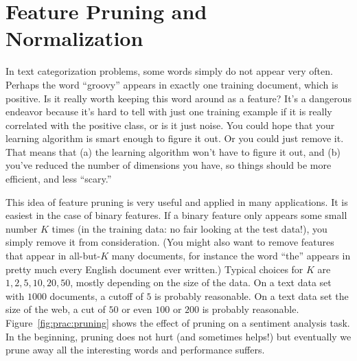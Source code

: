 

\section{Feature Pruning and Normalization}

In text categorization problems, some words simply do not appear very
often.  Perhaps the word ``groovy''
appears in exactly one training document, which is positive.  Is it
really worth keeping this word around as a feature?  It's a dangerous
endeavor because it's hard to tell with just one training example if
it is really correlated with the positive class, or is it just noise.
You could hope that your learning algorithm is smart enough to figure
it out.  Or you could just remove it.  That means that (a) the
learning algorithm won't have to figure it out, and (b) you've reduced
the number of dimensions you have, so things should be more efficient,
and less ``scary.''


This idea of feature pruning is very useful and applied in many
applications.  It is easiest in the case of binary features.  If a
binary feature only appears some small number $K$ times (in the
training data: no fair looking at the test data!), you simply remove
it from consideration.  (You might also want to remove features that
appear in all-but-$K$ many documents, for instance the word ``the''
appears in pretty much every English document ever written.)  Typical
choices for $K$ are $1, 2, 5, 10, 20, 50$, mostly depending on the
size of the data.  On a text data set with $1000$ documents, a cutoff
of $5$ is probably reasonable.  On a text data set the size of the
web, a cut of $50$ or even $100$ or $200$ is probably
reasonable.
Figure~\ref{fig:prac:pruning} shows the effect of pruning on a
sentiment analysis task.  In the beginning, pruning does not hurt (and
sometimes helps!) but eventually we prune away all the interesting
words and performance suffers.


